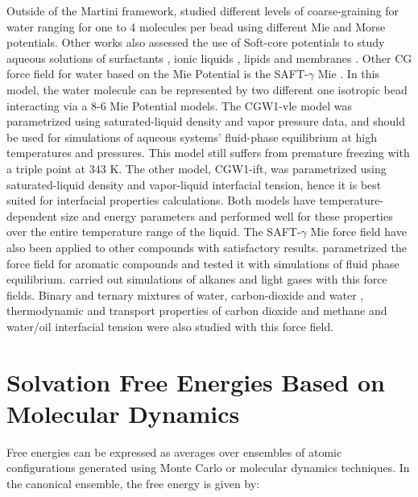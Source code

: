 Outside of the Martini framework,  studied different levels of coarse-graining for water ranging for one to 4 molecules per bead using different Mie and Morse potentials. Other works also assessed the use of Soft-core potentials to study aqueous solutions of surfactants \cite{shinoda2007}, ionic liquids \cite{bhargava2009}, lipids \cite{shinoda20102} and membranes \cite{pantano2009}. Other CG force field for water based on the Mie Potential is the SAFT-$\gamma$ Mie \cite{lobanova2015}. In this model, the water molecule can be represented by two different one isotropic bead interacting via a 8-6 Mie Potential models. The CGW1-vle model was parametrized using saturated-liquid density and vapor pressure data, and should be used for simulations of aqueous systems' fluid-phase equilibrium at high temperatures and pressures. This model still suffers from premature freezing with a triple point at 343 K. The other model, CGW1-ift, was parametrized using saturated-liquid density and vapor-liquid interfacial tension, hence it is best suited for interfacial properties calculations. Both models have temperature-dependent size and energy parameters and performed well for these properties over the entire temperature range of the liquid. The SAFT-$\gamma$ Mie force field have also been applied to other compounds with satisfactory results.  parametrized the force field for aromatic compounds and tested it with simulations of fluid phase equilibrium.  carried out simulations of alkanes and light gases with this force fields. Binary and ternary mixtures of water, carbon-dioxide and water \cite{lobanova2016}, thermodynamic and transport properties of carbon dioxide and methane \cite{cassiano1,cassiano2} and water/oil interfacial tension \cite{herdes2017} were also studied with this force field.   




\section{Solvation Free Energies Based on Molecular Dynamics}

Free energies can be expressed as averages over ensembles of atomic configurations generated using Monte Carlo or molecular dynamics techniques. In the canonical ensemble, the free energy is given by:  

